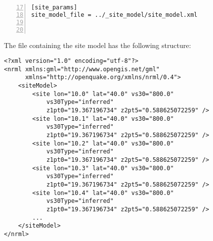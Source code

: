 \begin{itemize}
\begin{Verbatim}[frame=single, commandchars=\\\{\}, fontsize=\small,
    firstnumber=17, numbers=left, numbersep=2pt]
[site_params]
site_model_file = ../_site_model/site_model.xml



\end{Verbatim}
The file containing the site model has the following 
structure:
\begin{Verbatim}[frame=single, commandchars=\\\{\}, fontsize=\small]
<?xml version="1.0" encoding="utf-8"?>
<nrml xmlns:gml="http://www.opengis.net/gml"
      xmlns="http://openquake.org/xmlns/nrml/0.4">
    <siteModel>
        <site lon="10.0" lat="40.0" vs30="800.0" 
            vs30Type="inferred" 
            z1pt0="19.367196734" z2pt5="0.588625072259" />
        <site lon="10.1" lat="40.0" vs30="800.0" 
            vs30Type="inferred" 
            z1pt0="19.367196734" z2pt5="0.588625072259" />
        <site lon="10.2" lat="40.0" vs30="800.0" 
            vs30Type="inferred" 
            z1pt0="19.367196734" z2pt5="0.588625072259" />
        <site lon="10.3" lat="40.0" vs30="800.0" 
            vs30Type="inferred" 
            z1pt0="19.367196734" z2pt5="0.588625072259" />
        <site lon="10.4" lat="40.0" vs30="800.0" 
            vs30Type="inferred" 
            z1pt0="19.367196734" z2pt5="0.588625072259" />
        ...
    </siteModel>
</nrml>
\end{Verbatim}


\end{itemize}
